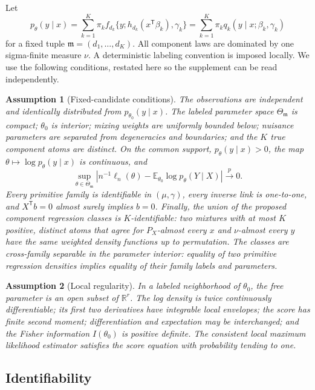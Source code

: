 \documentclass[a4paper,fleqn]{cas-sc}
\newtheorem{assumption}{Assumption}[section]
\newcommand{\E}{\mathbb E}
\newcommand{\R}{\mathbb R}
\newcommand{\T}{\mathsf T}
\newcommand{\model}{\mathfrak m}
\numberwithin{equation}{section}
\begin{document}
Let
\[
 p_\theta(y\mid x)=\sum_{k=1}^K\pi_k
 f_{d_k}\{y;h_{d_k}(x^\T\beta_k),\gamma_k\}
 =\sum_{k=1}^K\pi_kq_k(y\mid x;\beta_k,\gamma_k)
\]
for a fixed tuple $\model=(d_1,\ldots,d_K)$. All component laws are dominated by one sigma-finite measure $\nu$. A deterministic labeling convention is imposed locally. We use the following conditions, restated here so the supplement can be read independently.

\begin{assumption}[Fixed-candidate conditions]
\label{supp:ass-fixed}
The observations are independent and identically distributed from $p_{\theta_0}(y\mid x)$. The labeled parameter space $\Theta_{\model}$ is compact; $\theta_0$ is interior; mixing weights are uniformly bounded below; nuisance parameters are separated from degeneracies and boundaries; and the $K$ true component atoms are distinct. On the common support, $p_\theta(y\mid x)>0$, the map $\theta\mapsto\log p_\theta(y\mid x)$ is continuous, and
\[
 \sup_{\theta\in\Theta_{\model}}
 \left|n^{-1}\ell_n(\theta)-\E_{\theta_0}\log p_\theta(Y\mid X)\right|
 \xrightarrow{p}0.
\]
Every primitive family is identifiable in $(\mu,\gamma)$, every inverse link is one-to-one, and $X^\T b=0$ almost surely implies $b=0$. Finally, the union of the proposed component regression classes is $K$-identifiable: two mixtures with at most $K$ positive, distinct atoms that agree for $P_X$-almost every $x$ and $\nu$-almost every $y$ have the same weighted density functions up to permutation. The classes are cross-family separable in the parameter interior: equality of two primitive regression densities implies equality of their family labels and parameters.
\end{assumption}

\begin{assumption}[Local regularity]
\label{supp:ass-local}
In a labeled neighborhood of $\theta_0$, the free parameter is an open subset of $\R^r$. The log density is twice continuously differentiable; its first two derivatives have integrable local envelopes; the score has finite second moment; differentiation and expectation may be interchanged; and the Fisher information $I(\theta_0)$ is positive definite. The consistent local maximum likelihood estimator satisfies the score equation with probability tending to one.
\end{assumption}

\subsection{Identifiability}
\end{document}
